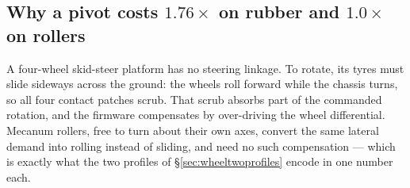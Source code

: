 \subsection{Why a pivot costs $1.76\times$ on rubber and $1.0\times$ on rollers}
\label{sec:wheelyaw}
A four-wheel skid-steer platform has no steering linkage. To rotate, its
tyres must slide sideways across the ground: the wheels roll forward while
the chassis turns, so all four contact patches scrub. That scrub absorbs
part of the commanded rotation, and the firmware compensates by
over-driving the wheel differential. Mecanum rollers, free to turn about
their own axes, convert the same lateral demand into rolling instead of
sliding, and need no such compensation --- which is exactly what the two
profiles of \S\ref{sec:wheeltwoprofiles} encode in one number each.

